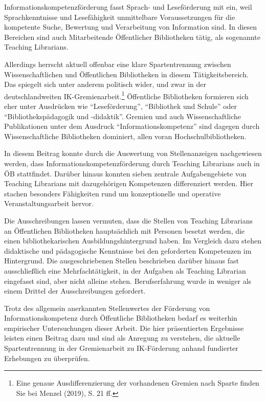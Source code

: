\documentclass[a4paper,
fontsize=11pt,
oneside,
numbers=noperiodatend,
parskip=half-,
bibliography=totoc,
final
]{scrartcl}
\begin{document}
Informationskompetenzförderung fasst Sprach- und Leseförderung mit ein,
weil Sprachkenntnisse und Lesefähigkeit unmittelbare Voraussetzungen für
die kompetente Suche, Bewertung und Verarbeitung von Information sind.
In diesen Bereichen sind auch Mitarbeitende Öffentlicher Bibliotheken
tätig, als sogenannte Teaching Librarians.

Allerdings herrscht aktuell offenbar eine klare Spartentrennung zwischen
Wissenschaftlichen und Öffentlichen Bibliotheken in diesem
Tätigkeitsbereich. Das spiegelt sich unter anderem politisch wider, und
zwar in der deutschlandweiten IK-Gremienarbeit.\footnote{Eine genaue
  Ausdifferenzierung der vorhandenen Gremien nach Sparte finden Sie bei
  Menzel (2019), S. 21 ff.} Öffentliche Bibliotheken formieren sich eher
unter Ausdrücken wie \enquote{Leseförderung}, \enquote{Bibliothek und
Schule} oder \enquote{Bibliothekspädagogik und -didaktik}. Gremien und
auch Wissenschaftliche Publikationen unter dem Ausdruck
\enquote{Informationskompetenz} sind dagegen durch Wissenschaftliche
Bibliotheken dominiert, allen voran Hochschulbibliotheken.

In diesem Beitrag konnte durch die Auswertung von Stellenanzeigen
nachgewiesen werden, dass Informationskompetenzförderung durch Teaching
Librarians auch in ÖB stattfindet. Darüber hinaus konnten sieben
zentrale Aufgabengebiete von Teaching Librarians mit dazugehörigen
Kompetenzen differenziert werden. Hier stachen besonders Fähigkeiten
rund um konzeptionelle und operative Veranstaltungsarbeit hervor.

Die Ausschreibungen lassen vermuten, dass die Stellen von Teaching
Librarians an Öffentlichen Bibliotheken hauptsächlich mit Personen
besetzt werden, die einen bibliothekarischen Ausbildungshintergrund
haben. Im Vergleich dazu stehen didaktische und pädagogische Kenntnisse
bei den geforderten Kompetenzen im Hintergrund. Die ausgeschriebenen
Stellen beschrieben darüber hinaus fast ausschließlich eine
Mehrfachtätigkeit, in der Aufgaben als Teaching Librarian eingefasst
sind, aber nicht alleine stehen. Berufserfahrung wurde in weniger als
einem Drittel der Ausschreibungen gefordert.

Trotz des allgemein anerkannten Stellenwertes der Förderung von
Informationskompetenz \linebreak durch Öffentliche Bibliotheken bedarf es weiterhin
empirischer Untersuchungen dieser Arbeit. Die hier präsentierten
Ergebnisse leisten einen Beitrag dazu und sind als Anregung zu
verstehen, die aktuelle Spartentrennung in der Gremienarbeit zu
IK-Förderung anhand fundierter Erhebungen zu überprüfen.
\end{document}
